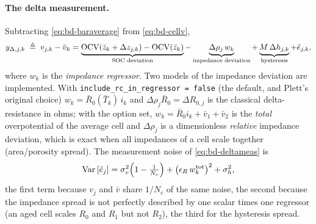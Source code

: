 \paragraph{The delta measurement.} Subtracting \eqref{eq:bd-baraverage} from
\eqref{eq:bd-cellv},
\begin{equation}
y_{\Delta,j,k} \;\triangleq\; v_{j,k} - \bar v_k
 = \underbrace{\mathrm{OCV}(\bar{z}_k + \Delta z_{j,k}) - \mathrm{OCV}(\bar{z}_k)}_{\text{SOC deviation}}
 - \underbrace{\Delta\rho_{j}\,w_k}_{\text{impedance deviation}}
 + \underbrace{M\,\Delta h_{j,k}}_{\text{hysteresis}} + \tilde e_{j,k},
\label{eq:bd-deltameas}
\end{equation}
where $w_k$ is the \emph{impedance regressor}. Two models of the impedance deviation are
implemented. With \texttt{include\_rc\_in\_regressor = false} (the default, and Plett's original
choice) $w_k = \bar R_0(\bar T_k)\,i_k$ and $\Delta\rho_j \bar R_0 = \Delta R_{0,j}$ is the
classical delta-resistance in ohms; with the option set, $w_k = \bar R_0 i_k + \bar v_1 + \bar
v_2$ is the \emph{total} overpotential of the average cell and $\Delta\rho_j$ is a dimensionless
\emph{relative} impedance deviation, which is exact when all impedances of a cell scale together
(area/porosity spread). The measurement noise of \eqref{eq:bd-deltameas} is
\begin{equation}
\operatorname{Var}\left[\tilde e_{j}\right] = \sigma_v^2\Big(1 - \tfrac1{N_c}\Big) + \big(\epsilon_R\,w^{\mathrm{tot}}_k\big)^2 + \sigma_h^2,
\label{eq:bd-Rdelta}
\end{equation}
the first term because $v_j$ and $\bar v$ share $1/N_c$ of the same noise, the second because the
impedance spread is not perfectly described by one scalar times one regressor (an aged cell
scales $R_0$ and $R_1$ but not $R_2$), the third for the hysteresis spread.

